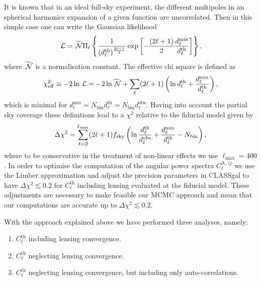 It is known that in an ideal full-sky experiment, the different multipoles in an spherical harmonics expansion of a given function are uncorrelated. Then in this simple case one can write the Gaussian likelihood
\begin{equation}
\label{Eq:GNC-Gaussian-likelihood}
\,{\mathcal L} = \widetilde{\,{\mathcal N}} \Pi_\ell \left\lbrace \frac{1}{(d_\ell^{\mathrm{th}})^{\frac{2\ell+1}{2}}} \exp \left[ -\frac{(2\ell+1)}{2} \frac{d_\ell^{\mathrm{mix}}}{d_\ell^{\mathrm{th}}}\right] \right\rbrace,                         
\end{equation}
where $\widetilde{\,{\mathcal N}}$ is a normalisation constant. The effective chi square is defined as
\begin{equation}
\label{Eq:GNC-effective-chi2}
\chi^2_{\mathrm{eff}} \equiv -2 \ln \,{\mathcal L} = -2 \ln \widetilde{\,{\mathcal N}} + \sum_\ell (2\ell+1)\left( \ln d_\ell^{\mathrm{th}} + \frac{d_\ell^{\mathrm{mix}}}{d_\ell^{\mathrm{th}}} \right), 
\end{equation}
which is minimal for $d_\ell^{\mathrm{mix}}= N_{\mathrm{bin}} d_\ell^{\mathrm{th}} = N_{\mathrm{bin}} d_\ell^{\mathrm{obs}}$. Having into account the partial sky coverage these definitions lead to a $\chi^2$ relative to the fiducial model given by                     
\begin{equation}
\label{Eq:relative-chi2}
\Delta \chi^2 = \sum_{\ell=2}^{\ell_{\mathrm{max}}} (2\ell+1) f_{\mathrm{sky}} \left( \ln \frac{d_\ell^{\mathrm{th}} }{d_\ell^{\mathrm{obs}}} + \frac{d_\ell^{\mathrm{mix}}}{d_\ell^{\mathrm{th}}} - N_{\mathrm{bin}} \right),
\end{equation}                           
where to be conservative in the treatment of non-linear effects we use $\ell_{\mathrm{max}}=400$. In order to optimise the computation of the angular power spectra $C_\ell^{\mathrm{A},\,ij}$ we use the Limber approximation and adjust the precision parameters in CLASSgal to have $\Delta \chi^2 \lesssim 0.2$ for $C_\ell^{\mathrm{th}}$ including lensing evaluated at the fiducial model. These adjustments are necessary to make feasible our MCMC approach and mean that our computations are accurate up to $\Delta \chi^2 \lesssim 0.2$.                              
                     
With the approach explained above we have performed three analyses, namely:
\begin{enumerate}
\item $C_\ell^{\mathrm{th}}$ including lensing convergence.
\item $C_\ell^{\mathrm{th}}$ neglecting lensing convergence.
\item $C_\ell^{\mathrm{th}}$ neglecting lensing convergence, but including only auto-correlations.
\end{enumerate}
                                                  
